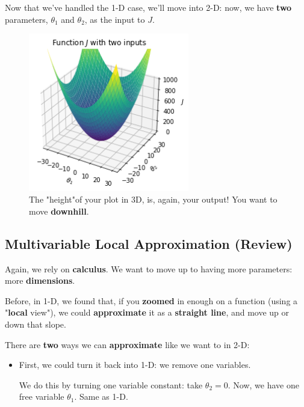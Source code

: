     Now that we've handled the 1-D case, we'll move into 2-D: now, we have \textbf{two} parameters, $\theta_1$ and $\theta_2$, as the input to $J$.
    
    \begin{figure}[H]
        \centering
            \includegraphics[width=70mm,scale=0.5]{images/gradient_descent_images/3dplot.png}
        
        \caption*{The "height"of your plot in 3D, is, again, your output! You want to move \textbf{downhill}.}
    \end{figure}
        
    \subsection{Multivariable Local Approximation (Review)}
    
        Again, we rely on \textbf{calculus}. We want to move up to having more parameters: more \textbf{dimensions}. 
        
        Before, in 1-D, we found that, if you \textbf{zoomed} in enough on a function (using a "\textbf{local} view"), we could \textbf{approximate} it as a \textbf{straight line}, and move up or down that slope.
        
        There are \textbf{two} ways we can \textbf{approximate} like we want to in 2-D:
        
        \begin{itemize}
            \item First, we could turn it back into 1-D: we remove one variables.
            
            We do this by turning one variable constant: take $\theta_2=0$. Now, we have one free variable $\theta_1$. Same as 1-D.\\
        \end{itemize}
        
